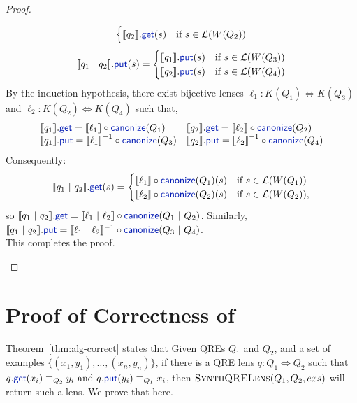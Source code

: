 \documentclass[acmsmall,screen]{acmart}
\newcommand{\kw}[1]{\textcolor{dkblue}{\ensuremath{\mathsf{#1}}}}
\newcommand{\sep}{\ensuremath{\ | \ }}
\newcommand{\canonize}{\ensuremath{\kw{canonize}}}
\newcommand{\get}{\ensuremath{\kw{get}}}
\newcommand{\lput}{\ensuremath{\kw{put}}}
\begin{document}
\begin{proof}
\begin{enumerate}
$$\begin{cases}
\llbracket q_2 \rrbracket.\get (s) & \text{if } s \in \mathcal{L}(W(Q_2))\\
\end{cases}$$
$$\llbracket q_1 \sep q_2 \rrbracket.\lput(s) =
\begin{cases}
\llbracket q_1 \rrbracket.\lput (s) & \text{if } s \in \mathcal{L}(W(Q_3))\\
\llbracket q_2 \rrbracket.\lput (s) & \text{if } s \in \mathcal{L}(W(Q_4))\\
\end{cases}
$$
By the induction hypothesis, there exist bijective lenses $\ell_1 : K(Q_1)
\Leftrightarrow K(Q_3)$ and $\ell_2 : K(Q_2) \Leftrightarrow K(Q_4)$ such that,
\[\begin{array}{l l }
\llbracket q_1 \rrbracket.\get = \llbracket \ell_1 \rrbracket \circ
\canonize(Q_1) & \llbracket q_2 \rrbracket.\get = \llbracket \ell_2 \rrbracket \circ
\canonize(Q_2)\\
\llbracket q_1 \rrbracket.\lput = {\llbracket \ell_1 \rrbracket}^{-1} \circ
\canonize(Q_3) & \llbracket q_2 \rrbracket.\lput = {\llbracket \ell_2 \rrbracket}^{-1} \circ
\canonize(Q_4)
\end{array}
\]
Consequently:
$$
\llbracket q_1 \sep q_2 \rrbracket.\get(s) =
\begin{cases}
\llbracket \ell_1 \rrbracket \circ
\canonize(Q_1) (s) & \text{if } s \in \mathcal{L}(W(Q_1))\\
\llbracket \ell_2 \rrbracket \circ
\canonize(Q_2) (s) & \text{if } s \in \mathcal{L}(W(Q_2)),\\
\end{cases}$$
so $\llbracket q_1 \sep q_2 \rrbracket.\get = \llbracket \ell_1 \sep
\ell_2 \rrbracket \circ \canonize(Q_1 \sep Q_2)$. Similarly, $\llbracket q_1 \sep q_2 \rrbracket.\lput = \llbracket \ell_1 \sep
\ell_2 \rrbracket^{-1} \circ \canonize(Q_3 \sep Q_4)$.\\
This completes the proof. 
\end{enumerate}
\end{proof}

\section{Proof of Correctness of }
Theorem~\ref{thm:alg-correct} states that
  Given QREs $Q_1$ and $Q_2$, and a set of examples
  $\{(x_1,y_1),\ldots,(x_n,y_n)\}$, if there is a QRE lens $q : Q_1
  \Leftrightarrow Q_2$ such that $q.\get(x_i) \equiv_{Q_2} y_i \text{ and }
q.\lput(y_i) \equiv_{Q_1} x_i$, then $\textproc{SynthQRELens}(Q_1,Q_2,exs)$ will
return such a lens.  We prove that here.
\end{document}
